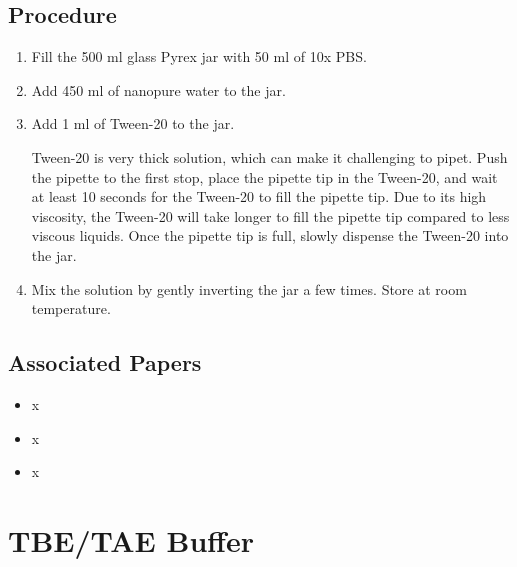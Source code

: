 \documentclass[
  letterpaper,
  DIV=11,
  numbers=noendperiod]{scrreprt}
\providecommand{\tightlist}{%
  \setlength{\itemsep}{0pt}\setlength{\parskip}{0pt}}\usepackage{longtable,booktabs,array}
\begin{document}
\hypertarget{procedure-102}{%
\section{Procedure}\label{procedure-102}}

\begin{enumerate}
\def\labelenumi{\arabic{enumi}.}
\item
  Fill the 500 ml glass Pyrex jar with 50 ml of 10x PBS.
\item
  Add 450 ml of nanopure water to the jar.
\item
  Add 1 ml of Tween-20 to the jar.

  \begin{tcolorbox}[enhanced jigsaw, rightrule=.15mm, title=\textcolor{quarto-callout-important-color}{\faExclamation}\hspace{0.5em}{NOTE}, titlerule=0mm, opacitybacktitle=0.6, toprule=.15mm, bottomrule=.15mm, opacityback=0, left=2mm, colframe=quarto-callout-important-color-frame, breakable, coltitle=black, colback=white, colbacktitle=quarto-callout-important-color!10!white, bottomtitle=1mm, leftrule=.75mm, toptitle=1mm, arc=.35mm]

  Tween-20 is very thick solution, which can make it challenging to
  pipet. Push the pipette to the first stop, place the pipette tip in
  the Tween-20, and wait at least 10 seconds for the Tween-20 to fill
  the pipette tip. Due to its high viscosity, the Tween-20 will take
  longer to fill the pipette tip compared to less viscous liquids. Once
  the pipette tip is full, slowly dispense the Tween-20 into the jar.

  \end{tcolorbox}
\item
  Mix the solution by gently inverting the jar a few times. Store at
  room temperature.
\end{enumerate}

\hypertarget{associated-papers-77}{%
\section{Associated Papers}\label{associated-papers-77}}

\begin{itemize}
\tightlist
\item
  x
\item
  x
\item
  x
\end{itemize}

\hypertarget{sec-recipe-TBE_TAE}{%
\chapter{TBE/TAE Buffer}\label{sec-recipe-TBE_TAE}}
\end{document}
